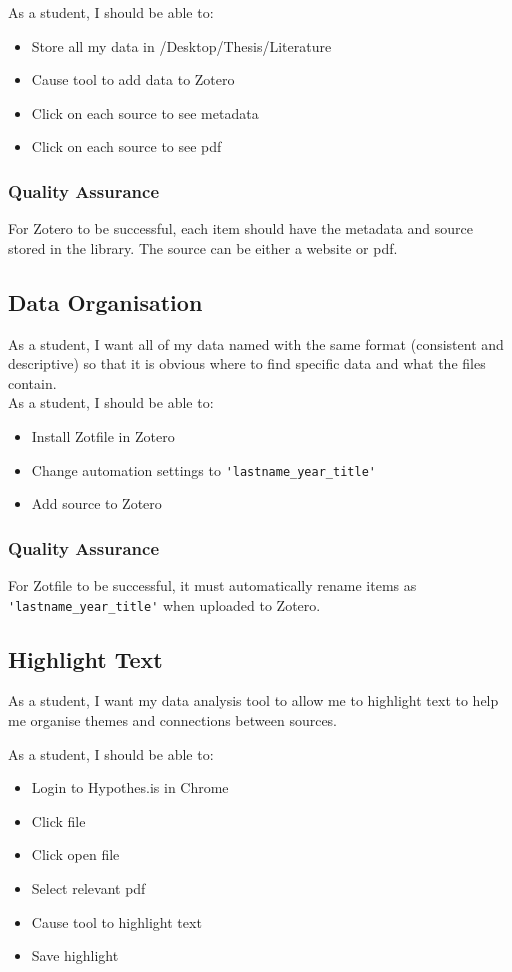 \documentclass{article}
\begin{document}
As a student, I should be able to:
\begin{itemize}
    \item Store all my data in /Desktop/Thesis/Literature
    \item Cause tool to add data to Zotero 
    \item Click on each source to see metadata
    \item Click on each source to see pdf
\end{itemize}

\subsubsection{Quality Assurance}
For Zotero to be successful, each item should have the metadata and source stored in the library. The source can be either a website or pdf.

\subsection{Data Organisation}
As a student, I want all of my data named with the same format (consistent and descriptive) so that it is obvious where to find specific data and what the files contain.\\

As a student, I should be able to:
\begin{itemize}
    \item Install Zotfile in Zotero 
    \item Change automation settings to \verb|'lastname_year_title'|
    \item Add source to Zotero
\end{itemize}

\subsubsection{Quality Assurance}
For Zotfile to be successful, it must automatically rename items as \verb|'lastname_year_title'| when uploaded to Zotero.

\subsection{Highlight Text}
As a student, I want my data analysis tool to allow me to highlight text to help me organise themes and connections between sources.

As a student, I should be able to:
\begin{itemize}
    \item Login to Hypothes.is in Chrome
    \item Click file
    \item Click open file
    \item Select relevant pdf
    \item Cause tool to highlight text
    \item Save highlight 
\end{itemize}
\end{document}
